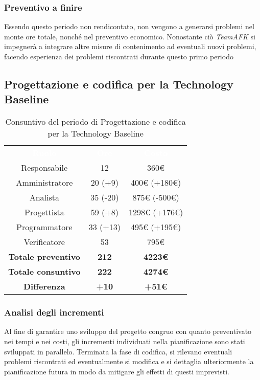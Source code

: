 \subsubsection{Preventivo a finire}
Essendo questo periodo non rendicontato, non vengono a generarsi problemi nel monte ore totale, nonché nel preventivo economico. Nonostante ciò \textit{TeamAFK} si impegnerà a integrare altre misure di contenimento ad eventuali nuovi problemi, facendo esperienza dei problemi riscontrati durante questo primo periodo

\subsection{Progettazione e codifica per la Technology Baseline}

\begin{table}[H]
\centering\renewcommand{\arraystretch}{1.5}
\caption{Consuntivo del periodo di Progettazione e codifica per la Technology Baseline}
\vspace{0.2cm}
\begin{tabular}{ c c c }
\rowcolor{redafk}
\textcolor{white}{\textbf{Ruolo}} & \textcolor{white}{\textbf{Ore}} &
\textcolor{white}{\textbf{Costo}}  \\
Responsabile 	& 12 & 360€ \\
Amministratore 	& 20 (+9) 	& 400€ (+180€) \\
Analista 		& 35 (-20) 	& 875€ (-500€) \\
Progettista		& 59 (+8) 	& 1298€ (+176€)\\
Programmatore	& 33 (+13) 	& 495€ (+195€)\\
Verificatore 	& 53 & 795€ \\
\textbf{Totale preventivo} & \textbf{212} & \textbf{4223€}  \\
\textbf{Totale consuntivo} & \textbf{222} & \textbf{4274€}  \\
\rowcolor{lastrowcolor}
\textbf{Differenza} & \textbf{+10} & \textbf{+51€}  \\
\end{tabular}
\end{table}

\subsubsection{Analisi degli incrementi}
Al fine di garantire uno sviluppo del progetto congruo con quanto preventivato
nei tempi e nei costi, gli incrementi individuati nella pianificazione sono stati sviluppati in parallelo. Terminata la fase di codifica, si rilevano eventuali problemi riscontrati ed eventualmente si modifica e si dettaglia ulteriormente la pianificazione futura in modo da mitigare gli effetti di questi imprevisti.

